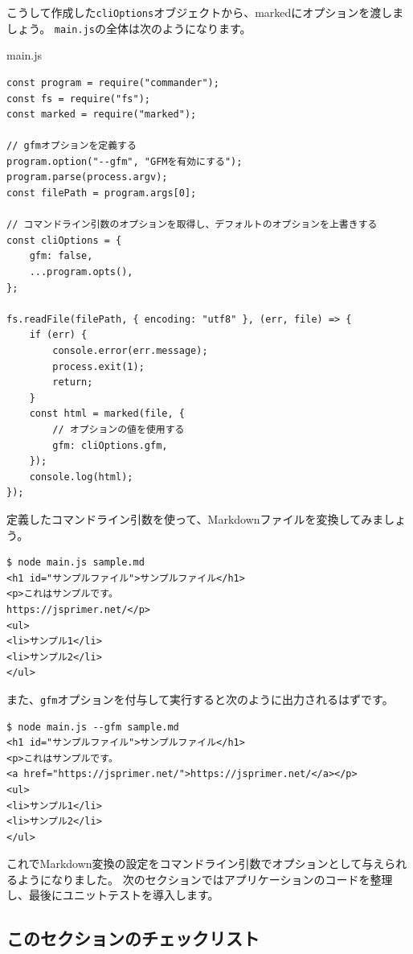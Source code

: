 こうして作成した\texttt{cliOptions}オブジェクトから、markedにオプションを渡しましょう。
\texttt{main.js}の全体は次のようになります。

\begin{listtitle}
main.js
\end{listtitle}
\begin{lstlisting}
const program = require("commander");
const fs = require("fs");
const marked = require("marked");

// gfmオプションを定義する
program.option("--gfm", "GFMを有効にする");
program.parse(process.argv);
const filePath = program.args[0];

// コマンドライン引数のオプションを取得し、デフォルトのオプションを上書きする
const cliOptions = {
    gfm: false,
    ...program.opts(),
};

fs.readFile(filePath, { encoding: "utf8" }, (err, file) => {
    if (err) {
        console.error(err.message);
        process.exit(1);
        return;
    }
    const html = marked(file, {
        // オプションの値を使用する
        gfm: cliOptions.gfm,
    });
    console.log(html);
});
\end{lstlisting}
\listend

定義したコマンドライン引数を使って、Markdownファイルを変換してみましょう。

\begin{lstlisting}
$ node main.js sample.md
<h1 id="サンプルファイル">サンプルファイル</h1>
<p>これはサンプルです。
https://jsprimer.net/</p>
<ul>
<li>サンプル1</li>
<li>サンプル2</li>
</ul>
\end{lstlisting}

また、\texttt{gfm}オプションを付与して実行すると次のように出力されるはずです。

\begin{lstlisting}
$ node main.js --gfm sample.md 
<h1 id="サンプルファイル">サンプルファイル</h1>
<p>これはサンプルです。
<a href="https://jsprimer.net/">https://jsprimer.net/</a></p>
<ul>
<li>サンプル1</li>
<li>サンプル2</li>
</ul>
\end{lstlisting}

これでMarkdown変換の設定をコマンドライン引数でオプションとして与えられるようになりました。
次のセクションではアプリケーションのコードを整理し、最後にユニットテストを導入します。

\hypertarget{section-checklist}{%
\subsection{このセクションのチェックリスト}\label{section-checklist}}

